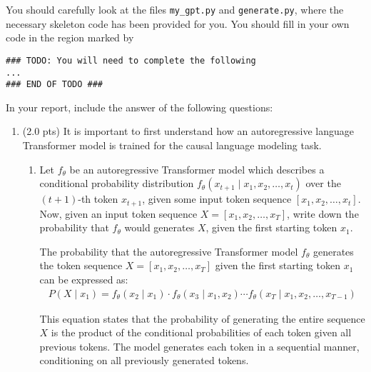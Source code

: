You should carefully look at the files \texttt{my\_gpt.py} and \texttt{generate.py}, where the necessary skeleton code has been provided for you. You should fill in your own code in the region marked by 

\begin{verbatim}
### TODO: You will need to complete the following
...
### END OF TODO ###
\end{verbatim}

In your report, include the answer of the following questions:
\begin{enumerate}

\item (2.0 pts)
It is important to first understand how an autoregressive language Transformer model is trained for the causal language modeling task. 

\begin{enumerate}

    \item Let $f_{\theta}$ be an autoregressive Transformer model which
    describes a conditional probability distribution $f_{\theta}(x_{t + 1} \mid
    x_1, x_2, \dots, x_t)$ over the $(t+1)$-th token $x_{t+1}$, given some input
    token sequence $[x_1, x_2, \dots, x_t]$. Now, given an input token sequence
    $X = [x_1, x_2, \dots, x_T]$, write down the probability that $f_{\theta}$
    would generates $X$, given the first starting token $x_1$.

    \begin{answerbox}[1.5in]
    The probability that the autoregressive Transformer model $f_{\theta}$ generates the token
    sequence $X = [x_1, x_2, \dots, x_T]$ given the first starting token $x_1$ can be expressed as:
    \begin{align*}
        P(X \mid x_1) = f_{\theta}(x_2 \mid x_1) \cdot f_{\theta}(x_3 \mid x_1, x_2) \cdots f_{\theta}(x_T \mid x_1, x_2, \dots, x_{T-1})
    \end{align*}

    This equation states that the probability of generating the entire sequence
    $X$ is the product of the conditional probabilities of each token given all
    previous tokens. The model generates each token in a sequential manner,
    conditioning on all previously generated tokens.
    
    \end{answerbox}


\end{enumerate}
\end{enumerate}
